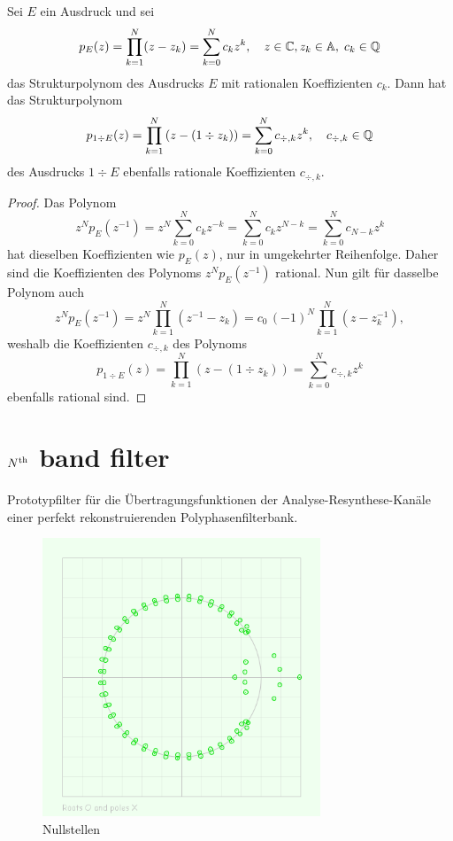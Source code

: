 \begin{theorem}
Sei $E$ ein Ausdruck und sei
\begin{equation*}
  p_E(z) = \prod_{k=1}^N (z-z_k) = \sum_{k=0}^N c_k z^k
  ,\quad
  z\in\mathbb{C},z_k\in\mathbb{A},\;c_k\in\mathbb{Q}
\end{equation*}
das Strukturpolynom des Ausdrucks $E$ mit rationalen Koeffizienten $c_k$.
Dann hat das Strukturpolynom
\begin{equation*}
  p_{1\div E}(z) = \prod_{k=1}^N \left(z-(1\div z_k)\right)
                 = \sum_{k=0}^N c_{\div,k} z^k
  ,\quad
  c_{\div,k}\in\mathbb{Q}
\end{equation*}
des Ausdrucks $1\div E$ ebenfalls rationale Koeffizienten $c_{\div,k}$.
\begin{proof}
Das Polynom
\begin{equation*}
  z^N
  p_E(z^{-1}) = z^N\sum_{k=0}^N c_k z^{-k}
              =    \sum_{k=0}^N c_k z^{N-k}
              =    \sum_{k=0}^N c_{N-k} z^k
\end{equation*}
hat dieselben Koeffizienten wie $p_E(z)$,
nur in umgekehrter Reihenfolge.
Daher sind die Koeffizienten des Polynoms 
$z^N p_E(z^{-1})$ rational.
Nun gilt für dasselbe Polynom auch
\begin{equation*}
  z^N p_E(z^{-1}) 
  = 
  z^N \prod_{k=1}^N (z^{-1}-z_k)
  =
  c_0\,(-1)^N \prod_{k=1}^N (z-z_k^{-1}),
\end{equation*}
weshalb die Koeffizienten $c_{\div,k}$ des Polynoms
\begin{equation*}
  p_{1\div E}(z) = \prod_{k=1}^N (z-(1\div z_k))
                 = \sum_{k=0}^N c_{\div,k} z^k
\end{equation*}
ebenfalls rational sind. 
\end{proof}
\end{theorem}


\pagebreak
\section{$N^{\rm th}$ band filter}\label{se:AnhangFilter}

Prototypfilter für die Übertragungsfunktionen 
der Analyse-Resynthese-Kanäle einer 
perfekt rekonstruierenden Polyphasenfilterbank. 

\begin{figure}[H]
\centering
\includegraphics[width=83mm]{images/Figure_roots4.png}
\caption{Nullstellen}
\end{figure}


